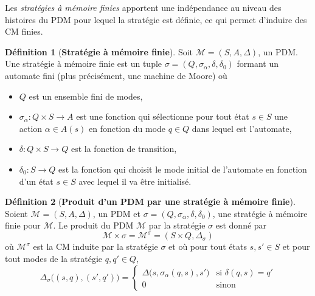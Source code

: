 \documentclass[12pt,a4paper]{report}
\theoremstyle{definition}%
\newtheorem{definition}{Définition}[chapter]
\theoremstyle{remark}
\let\labelitemi\labelitemii
\begin{document}
Les \textit{stratégies à mémoire finies}
apportent une indépendance au niveau des histoires du PDM pour lequel la
stratégie est définie, ce qui permet d'induire des CM finies.

\begin{definition}[\textbf{Stratégie à mémoire finie}]
Soit $\mathcal{M} = (S, A, \Delta)$, un PDM. Une stratégie à mémoire finie
est un tuple $\sigma = (Q, \sigma_\alpha, \delta, \delta_0)$ formant un automate fini (plus précisément, une machine de Moore) où
\begin{itemize}
	\renewcommand{\labelitemi}{\tiny$\bullet$}
	\item $Q$ est un ensemble fini de modes,
	\item $\sigma_\alpha : Q \times S \rightarrow A$ est une fonction qui sélectionne pour tout état $s \in S$ une action $\alpha \in A(s)$ en fonction du mode $q \in Q$ dans lequel est
	l'automate,
	\item $\delta: Q \times S \rightarrow Q$ est la fonction de transition,
	\item $\delta_0 : S \rightarrow Q$ est la fonction qui choisit le mode initial de l'automate en fonction d'un état $s \in S$ avec lequel il va être initialisé.
\end{itemize}
\end{definition}

\begin{definition}[\textbf{Produit d'un PDM par une stratégie à mémoire finie}]
Soient $\mathcal{M} = (S, A, \Delta)$, un PDM et $\sigma = (Q, \sigma_\alpha, \delta, \delta_0)$, une stratégie à mémoire finie pour $\mathcal{M}$.
Le produit du PDM $\mathcal{M}$ par la stratégie $\sigma$ est donné par
\[ \mathcal{M} \times \sigma = \mathcal{M}^\sigma = (S \times Q, \Delta_\sigma) \]
où $\mathcal{M}^\sigma$ est la CM induite par la stratégie $\sigma$ et où
pour tout états $s, s' \in S$ et pour tout modes de la stratégie $q, q' \in Q$,
\[
	\Delta_\sigma\big((s, q), (s', q')\big) =
	\begin{cases}
	\Delta\big(s, \sigma_\alpha(q, s), s'\big) & \text{si } \delta(q, s) = q' \\
	0 & \text{sinon}
	\end{cases}
\]
\end{definition}
\end{document}
